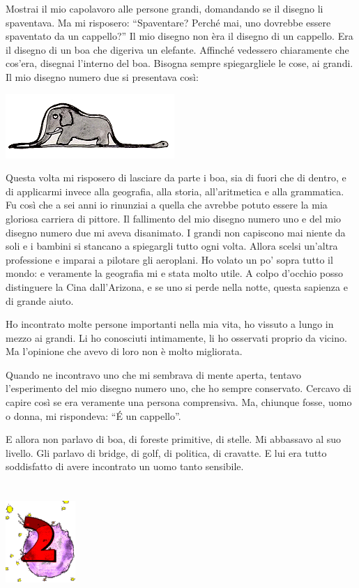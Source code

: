 \documentclass[11pt]{scrbook}
\begin{document}
Mostrai il mio capolavoro alle persone grandi, domandando se il disegno
li spaventava. Ma mi risposero: ``Spaventare? Perché mai, uno dovrebbe
essere spaventato da un cappello?'' Il mio disegno non èra il disegno di
un cappello. Era il disegno di un boa che digeriva un elefante. Affinché
vedessero chiaramente che cos'era, disegnai l'interno del boa. Bisogna
sempre spiegargliele le cose, ai grandi. Il mio disegno numero due si
presentava così:

\begin{center}
\includegraphics{img/boa}
\end{center}

Questa volta mi risposero di lasciare da parte i boa, sia di fuori che
di dentro, e di applicarmi invece alla geografia, alla storia,
all'aritmetica e alla grammatica. Fu così che a sei anni io rinunziai a
quella che avrebbe potuto essere la mia gloriosa carriera di pittore. Il
fallimento del mio disegno numero uno e del mio disegno numero due mi
aveva disanimato. I grandi non capiscono mai niente da soli e i bambini
si stancano a spiegargli tutto ogni volta. Allora scelsi un'altra
professione e imparai a pilotare gli aeroplani. Ho volato un po' sopra
tutto il mondo: e veramente la geografia mi e stata molto utile. A colpo
d'occhio posso distinguere la Cina dall'Arizona, e se uno si perde nella
notte, questa sapienza e di grande aiuto.

Ho incontrato molte persone importanti nella mia vita, ho vissuto a
lungo in mezzo ai grandi. Li ho conosciuti intimamente, li ho osservati
proprio da vicino. Ma l'opinione che avevo di loro non è molto
migliorata.

Quando ne incontravo uno che mi sembrava di mente aperta, tentavo
l'esperimento del mio disegno numero uno, che ho sempre conservato.
Cercavo di capire così se era veramente una persona comprensiva. Ma,
chiunque fosse, uomo o donna, mi rispondeva: ``É un cappello''.

E allora non parlavo di boa, di foreste primitive, di stelle. Mi
abbassavo al suo livello. Gli parlavo di bridge, di golf, di politica,
di cravatte. E lui era tutto soddisfatto di avere incontrato un uomo
tanto sensibile.

\chapter{}
\begin{center}
\includegraphics{img/chapter2}
\end{center}
\end{document}

